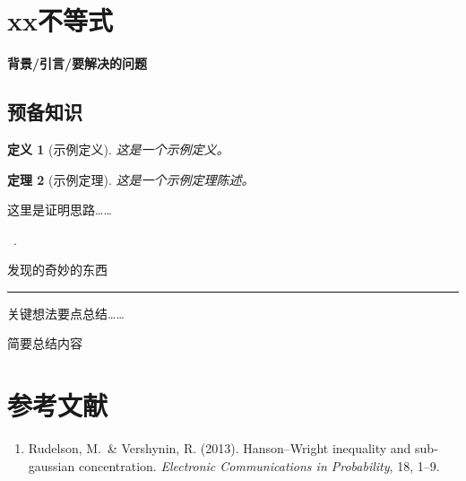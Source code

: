 \documentclass[12pt]{article} %
\newenvironment{ShadedTheorem}[1][]{%
  \begin{shaded}\begin{theorem}[#1]}{\end{theorem}\end{shaded}}
\theoremstyle{customthm}
\newtheorem{theorem}{定理}[section]
\theoremstyle{customdef}
\newtheorem{definition}[theorem]{定义}
\newcounter{chapter}
\newcommand{\setchapter}[2]{%
  \setcounter{chapter}{#1}%
  \setcounter{section}{0}%
  \def\ChapterTitle{#2}%
}
\newcommand{\ChapterHeading}{%
  \vspace*{0.6cm}
  {\fontsize{26pt}{28pt}\selectfont\bfseries\color{keydark}
   第\arabic{chapter}章\ \ChapterTitle\par}
  \vspace{0.6cm}
}
\newenvironment{RemarkNote}[1][]{%
  \par\smallskip
  \noindent{\bfseries\color{accentD}Remark}%
  \ifx\relax#1\relax\else{\bfseries\color{accentD} \ (#1)}\fi
  \ .\ %
}{%
  \par\smallskip
  {\color{ink!60}\rule{\linewidth}{0.4pt}}
  \smallskip
}
\renewenvironment{proof}[1][证明]{\par
  \pushQED{\qed}%
  \normalfont \topsep6pt \partopsep0pt
  \trivlist
  \item[\hskip\labelsep\bfseries #1.]\ignorespaces
}{\popQED\endtrivlist}
\newcommand{\SeriesCardEnd}[3]{%
  \vspace{1.4em}\noindent
  \setlength{\fboxsep}{8pt}\setlength{\fboxrule}{0.8pt}%
  \fcolorbox{brand}{soft}{%
    \parbox{\dimexpr\linewidth-2\fboxsep-2\fboxrule\relax}{%
      \textbf{集中不等式系列 · 第 #1 篇}\par
      \vspace{0.3em}%
      \noindent
      \begin{minipage}[t]{0.49\linewidth}\raggedright
        \textit{上一篇：}#2
      \end{minipage}\hfill
      \begin{minipage}[t]{0.49\linewidth}\raggedleft
        \textit{下一篇：}#3
      \end{minipage}%
    }%
  }%
}
\begin{document}
\setchapter{1}{示例章标题}

\section{xx不等式}
\begin{SideBar}
\textbf{背景/引言/要解决的问题}
\end{SideBar}
\subsection{预备知识}

\begin{definition}[示例定义]
这是一个示例定义。\par
\end{definition}
\begin{ShadedTheorem}[示例定理]
    这是一个示例定理陈述。
\end{ShadedTheorem}


\begin{proof}
这里是证明思路……
\end{proof}
\begin{RemarkNote}
    发现的奇妙的东西
\end{RemarkNote}
\begin{KeyBox}
关键想法要点总结……
\end{KeyBox}

\begin{Takeaway}
简要总结内容
\end{Takeaway}

\section*{参考文献}
\begin{enumerate}
  \item Rudelson, M.\ \& Vershynin, R. (2013). Hanson--Wright inequality and sub-gaussian concentration. \textit{Electronic Communications in Probability}, 18, 1--9.
\end{enumerate}
\end{document}
